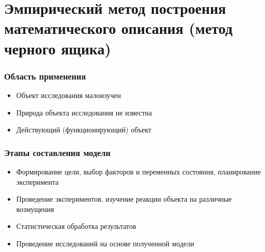 	\section{Эмпирический метод построения математического описания (метод черного ящика)}
	
\begin{frame}
	\frametitle{Область применения}
	\begin{itemize}
	\item Объект исследования малоизучен
	\item Природа объекта исследования не известна
	\item Действующий (функционирующий) объект
	\end{itemize}
\end{frame}

\begin{frame}
	\frametitle{Этапы составления  модели}
	\begin{itemize}
		\item Формирование цели, выбор факторов и переменных состояния, планирование эксперимента
		\item Проведение экспериментов, изучение реакции объекта на различные возмущения
		\item Статистическая обработка результатов
		\item Проведение исследований на основе полученной модели
	\end{itemize}
	
\end{frame}

